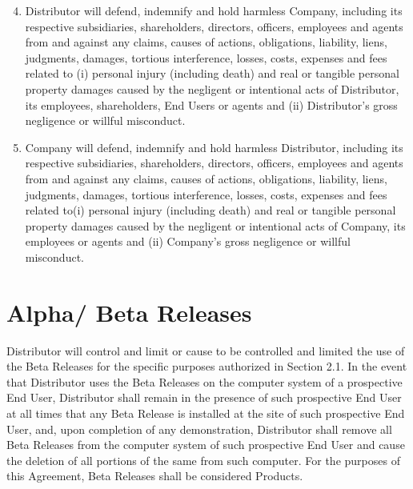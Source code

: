 \documentclass[letterpaper,10pt,english]{sphinxmanual}
\begin{document}
\begin{enumerate}
\setcounter{enumi}{3}
\item {} 
Distributor will defend, indemnify and hold harmless Company, including its respective subsidiaries, shareholders, directors, officers, employees and agents from and against any claims, causes of actions, obligations, liability, liens, judgments, damages, tortious interference, losses, costs, expenses and fees related to (i) personal injury (including death) and real or tangible personal property damages caused by the negligent or intentional acts of Distributor, its employees, shareholders, End Users or agents and (ii) Distributor’s gross negligence or willful misconduct.

\item {} 
Company will defend, indemnify and hold harmless Distributor, including its respective subsidiaries, shareholders, directors, officers, employees and agents from and against any claims, causes of actions, obligations, liability, liens, judgments, damages, tortious interference, losses, costs, expenses and fees related to(i) personal injury (including death) and real or tangible personal property damages caused by the negligent or intentional acts of Company, its employees or agents and (ii) Company’s gross negligence or willful misconduct.

\end{enumerate}


\section{Alpha/ Beta Releases}
\label{\detokenize{distributionandpackaging:alpha-beta-releases}}
Distributor will control and limit or cause to be controlled and limited the use of the Beta Releases for the specific purposes authorized in Section 2.1. In the event that Distributor uses the Beta Releases on the computer system of a prospective End User, Distributor shall remain in the presence of such prospective End User at all times that any Beta Release is installed at the site of such prospective End User, and, upon completion of any demonstration, Distributor shall remove all Beta Releases from the computer system of such prospective End User and cause the deletion of all portions of the same from such computer. For the purposes of this Agreement, Beta Releases shall be considered Products.
\end{document}
